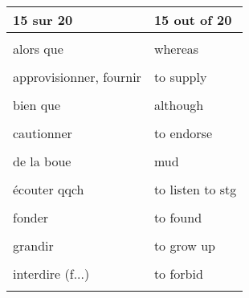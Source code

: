 \documentclass[
  10pt,
]{article}
\begin{document}
\begin{longtable}{ll}
\toprule
15 sur 20 & 15 out of 20\\
\midrule
\cellcolor{gray!6}{adhérer à qqch} & \cellcolor{gray!6}{to subscribe to stg}\\

alors que & whereas\\

\cellcolor{gray!6}{appartenir à} & \cellcolor{gray!6}{to belong to}\\

approvisionner, fournir & to supply\\

\cellcolor{gray!6}{attendre de qn qu'il fasse qqch} & \cellcolor{gray!6}{to expect sb to do stg}\\

bien que & although\\

\cellcolor{gray!6}{capacité d'attention} & \cellcolor{gray!6}{attention span}\\

cautionner & to endorse\\

\cellcolor{gray!6}{concret} & \cellcolor{gray!6}{hands-on}\\

de la boue & mud\\

\cellcolor{gray!6}{des aiguilles à tricoter} & \cellcolor{gray!6}{knitting needles}\\

écouter qqch & to listen to stg\\

\cellcolor{gray!6}{expliciter, détailler} & \cellcolor{gray!6}{to spell out}\\

fonder & to found\\

\cellcolor{gray!6}{froncer les sourcils, désapprouver qqch} & \cellcolor{gray!6}{to frown (on stg)}\\

grandir & to grow up\\

\cellcolor{gray!6}{interdire (b...)} & \cellcolor{gray!6}{to ban}\\

interdire (f...) & to forbid\\

\cellcolor{gray!6}{interdire (p...)} & \cellcolor{gray!6}{to prohibit}\\


\end{longtable}
\end{document}
